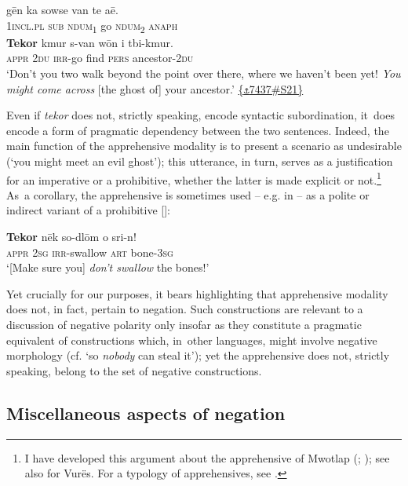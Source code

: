 \documentclass[output=paper,colorlinks,citecolor=brown,draft]{langscibook}
\begin{document}
    \gll gēn ka sowse van te aē.  \\
     \textsc{1incl.pl} \textsc{sub} \textsc{ndum\textsubscript{1}} go \textsc{ndum\textsubscript{2}} \textsc{anaph} \\

    \gll \textbf{Tekor} kmur s-van wōn i tbi-kmur.\\  
    \textsc{appr} \textsc{2du} \textsc{irr-}go find \textsc{pers} ancestor-\textsc{2du} \\
    \glt ‘Don’t you two walk beyond the point over there, where we haven’t been yet! \textit{You might come across} [the ghost of] your ancestor.’ \quad \href{https://doi.org/10.24397/pangloss-0007437#S21}{\{\texttt{⚓}7437\#S21\}}
\z 

Even if \textit{tekor} does not, strictly speaking, encode syntactic subordination, it~does encode a form of pragmatic dependency between the two sentences. \mbox{Indeed}, the main function of the apprehensive modality is to present a scenario as undesirable (‘you might meet an evil ghost’); this utterance, in turn, serves as a justification for an imperative or a prohibitive, whether the latter is made explicit or not.\footnote{I have developed this argument about the apprehensive of Mwotlap (\citealt[301--312]{François2003}; \citealt{FrançoisForthcomingb}); see also \citet[679--680]{Malau2016} for Vurës. For a typology of apprehensives, see \citet{VuillermentEtAlforthcomingA}.} As~a corollary, the apprehensive is sometimes used -- e.g. in  -- as a polite or indirect variant of a prohibitive []:

\ea\label{ex:dor:bones}
    \gll \textbf{Tekor} nēk so-dlōm o sri-n!\\
         \textsc{appr} \textsc{2sg} \textsc{irr}-swallow \textsc{art} bone-\textsc{3sg}\\
    \glt‘[Make sure you] \textit{don’t swallow} the bones!’ 
\z

Yet crucially for our purposes, it bears highlighting that apprehensive modality does not, in fact, pertain to negation. Such constructions are relevant to a discussion of negative polarity only insofar as they constitute a pragmatic equivalent of constructions which, in~other languages, might involve negative morphology (cf. ‘so \textit{nobody} can steal it’); yet the apprehensive does not, strictly speaking, belong to the set of negative constructions.

\subsection{Miscellaneous aspects of negation}\label{sec:dor:4.6} 
\end{document}
